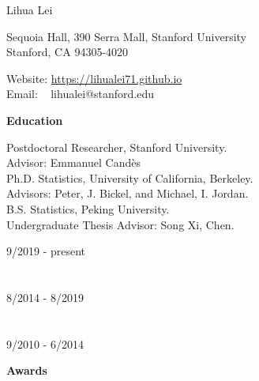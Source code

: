 \documentclass{article}
\begin{document}
\begin{Huge}
\noindent Lihua Lei
\end{Huge}

\vspace{5mm}
\begin{minipage}{0.6\linewidth}
  \flushleft
\noindent Sequoia Hall, 390 Serra Mall, Stanford University \\
\noindent Stanford, CA 94305-4020
\end{minipage}
\hfill
\begin{minipage}{0.4\linewidth}
  Website: \url{https://lihualei71.github.io}\\
  Email: \,\,\,\,\,lihualei@stanford.edu
\end{minipage}

\vspace{5mm}
\begin{large}
\noindent \textbf{Education}
\end{large}
\vspace{5mm}

\begin{minipage}{0.65\linewidth}
\noindent Postdoctoral Researcher, Stanford University.\\
Advisor: Emmanuel Cand\`{e}s\\

\noindent Ph.D. Statistics, University of California, Berkeley.\\
Advisors: Peter, J. Bickel, and Michael, I. Jordan.\\

\noindent B.S. Statistics, Peking University. \\
Undergraduate Thesis Advisor: Song Xi, Chen.
\end{minipage}\hfill
\begin{minipage}{0.34\linewidth}
\flushright
\vspace{-5mm}
9/2019 - present\\
~\\
~\\
8/2014 - 8/2019 \\
~\\
~\\
9/2010 - 6/2014\\
\end{minipage}

\vspace{5mm}
\begin{large}
\noindent \textbf{Awards}
\end{large}
\end{document}
